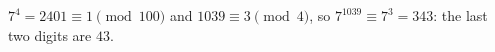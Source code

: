 $7^4=2401\equiv1\pmod{100}$ and $1039\equiv3\pmod4$, so $7^{1039}\equiv7^3=343$: the last two digits are $\boxed{43}$.
